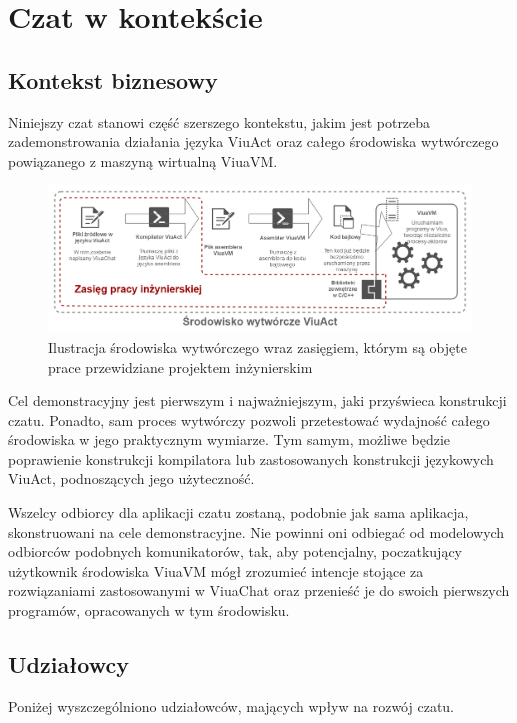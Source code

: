\documentclass[11pt,oneside,a4paper,titlepage,onecolumn]{article}
\begin{document}
\section{Czat w kontekście}

\subsection{Kontekst biznesowy}

Niniejszy czat stanowi część szerszego kontekstu, jakim jest potrzeba zademonstrowania działania języka ViuAct oraz całego środowiska wytwórczego powiązanego z maszyną wirtualną ViuaVM.

\begin{figure}[h]
	\centering
	\includegraphics[width=\textwidth]{viuavm-env}
	\caption{Ilustracja środowiska wytwórczego wraz zasięgiem, którym są objęte prace przewidziane projektem inżynierskim}
\end{figure}

Cel demonstracyjny jest pierwszym i najważniejszym, jaki przyświeca konstrukcji czatu. Ponadto, sam proces wytwórczy pozwoli
przetestować wydajność całego środowiska w jego praktycznym wymiarze. Tym samym, możliwe będzie poprawienie konstrukcji kompilatora 
lub zastosowanych konstrukcji językowych ViuAct, podnoszących jego użyteczność.

Wszelcy odbiorcy dla aplikacji czatu zostaną, podobnie jak sama aplikacja, skonstruowani na cele demonstracyjne. Nie powinni oni
odbiegać od modelowych odbiorców podobnych komunikatorów, tak, aby potencjalny, poczatkujący użytkownik środowiska ViuaVM mógł
zrozumieć intencje stojące za rozwiązaniami zastosowanymi w ViuaChat oraz przenieść je do swoich pierwszych programów, opracowanych
w tym środowisku.

\subsection{Udziałowcy}

Poniżej wyszczególniono udziałowców, mających wpływ na rozwój czatu.
\end{document}
